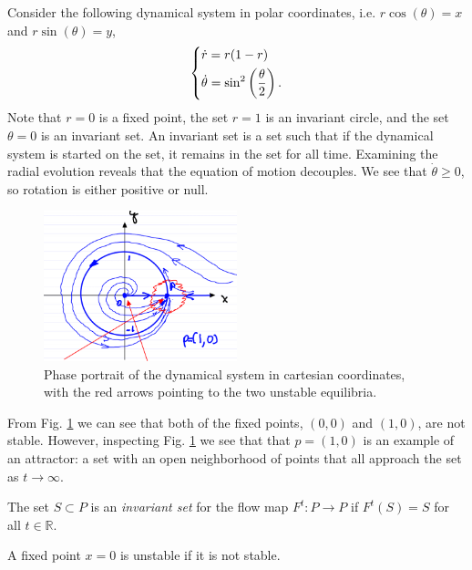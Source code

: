 \begin{ex}[]
	Consider the following dynamical system in polar coordinates, i.e. $r\cos(\theta) = x$ and $r \sin(\theta) = y$,
	\begin{align}
		\begin{dcases}
			\dot{r} = r(1-r) \\ \dot{\theta} = \sin^2\left( \frac{\theta}{2} \right).
		\end{dcases}
	\end{align}
	Note that $r=0$ is a fixed point, the set $r=1$ is an invariant circle, and the set $\theta=0$ is an invariant set. An invariant set is a set such that if the dynamical system is started on the set, it remains in the set for all time. Examining the radial evolution reveals that the equation of motion decouples. We see that $\dot{\theta}\geq 0$, so rotation is either positive or null.
	\begin{figure}[h!]
		\centering
		\includegraphics[width=0.5\textwidth]{figures/ch2/5polar_cds.png}
		\caption{Phase portrait of the dynamical system in cartesian coordinates, with the red arrows pointing to the two unstable equilibria.}
		\label{fig:polar_attractor}
	\end{figure}

	 From Fig. \ref{fig:polar_attractor} we can see that both of the fixed points, $(0,0)$ and $(1,0)$, are not stable. However, inspecting Fig. \ref{fig:polar_attractor} we see that that $p=(1,0)$ is an example of an attractor: a set with an open neighborhood of points that all approach the set as $t\to \infty $.
\end{ex}

\begin{definition}
	The set $S \subset P$ is an \emph{invariant set} for the flow map $F^{t}:P \to P$ if $F^{t}(S) =S$ for all $t \in \mathbb{R}$.
\end{definition}

\begin{definition}
	A fixed point $ {x}=0$ is unstable if it is not stable.
\end{definition}

